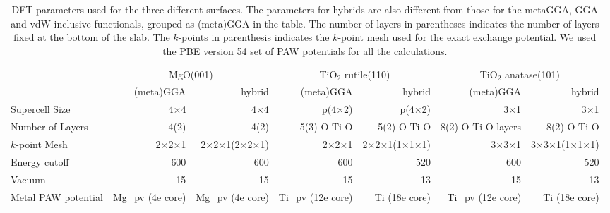 \begin{turnpage}
\begin{table}

\caption{\label{tab:dft_parameters}DFT parameters used for the three different surfaces. The parameters for hybrids are also different from those for the metaGGA, GGA and vdW-inclusive functionals, grouped as (meta)GGA in the table. The number of layers in parentheses indicates the number of layers fixed at the bottom of the slab. The $k$-points in parenthesis indicates the $k$-point mesh used for the exact exchange potential. We used the PBE version 54 set of PAW potentials for all the calculations.}
\begin{tabular}{lrrrrrr}
\toprule
 & \multicolumn{2}{c}{MgO(001)} & \multicolumn{2}{c}{TiO$_2$ rutile(110)} & \multicolumn{2}{c}{TiO$_2$ anatase(101)} \\ \cmidrule(lr){2-3}  \cmidrule(lr){4-5} \cmidrule(lr){6-7}
 & (meta)GGA & hybrid & (meta)GGA & hybrid & (meta)GGA & hybrid \\
\midrule
Supercell Size & 4${\times}$4 & 4${\times}$4 & p(4${\times}$2) & p(4${\times}$2) & 3${\times}$1 & 3${\times}$1 \\
Number of Layers & 4(2) & 4(2) & 5(3) O-Ti-O & 5(2) O-Ti-O & 8(2) O-Ti-O layers & 8(2) O-Ti-O \\
$k$-point Mesh & 2$\times$2$\times$1 & 2$\times$2$\times$1(2$\times$2$\times$1) & 2$\times$2$\times$1 & 2$\times$2$\times$1(1$\times$1$\times$1) & 3$\times$3$\times$1 & 3$\times$3$\times$1(1$\times$1$\times$1) \\
Energy cutoff & 600 & 600 & 600 & 520 & 600 & 520 \\
Vacuum & 15 & 15 & 15 & 13 & 15 & 13 \\
Metal PAW potential & Mg\_pv (4e core) & Mg\_pv (4e core) & Ti\_pv (12e core) & Ti (18e core) & Ti\_pv (12e core) & Ti (18e core) \\
\bottomrule
\end{tabular}

\end{table}
\end{turnpage}